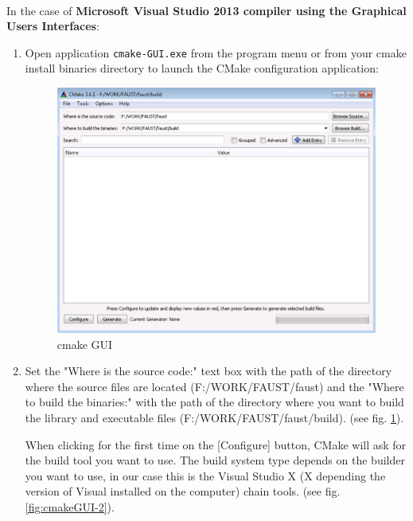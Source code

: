 \paragraph{}In the case of \textbf{Microsoft Visual Studio 2013 compiler using the Graphical Users Interfaces}:
\begin{enumerate}
\item Open application \texttt{cmake-GUI.exe} from the program menu or from your cmake install binaries directory  to launch the CMake configuration application:

\begin{figure}[!h] %
\centering
\includegraphics[scale=0.5]{images/cmakeGUI-1-eps-converted-to.pdf}
\caption{cmake GUI}
\label{fig:cmakeGUI-1}
\end{figure}


\item Set the "Where is the source code:" text box with the path of the directory where the source files are located (F:/WORK/FAUST/faust) and the "Where to build the binaries:" with the path of the directory where you want to build the library and executable files (F:/WORK/FAUST/faust/build). (see fig.  \ref{fig:cmakeGUI-1}).

When clicking for the first time on the [Configure] button, CMake will ask for the build tool you want to use. The build system type depends on the builder you want to use, in our case this is the Visual Studio X (X depending the version of Visual installed on the computer) chain tools. (see fig. \ref{fig:cmakeGUI-2}).



\end{enumerate}
